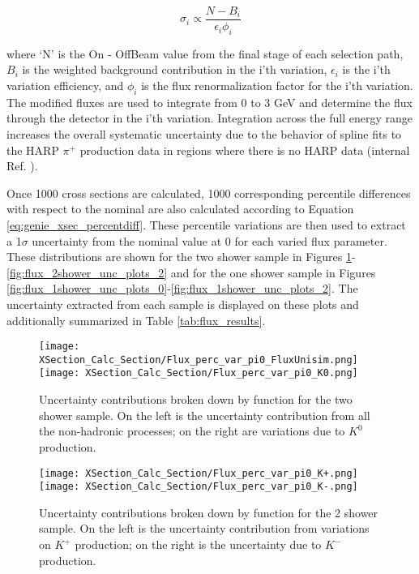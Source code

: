 \begin{equation} \label{eq:flux_xsec_var_0}
  \sigma_i \propto \frac{N - B_i}{\epsilon_i \phi_i} 
\end{equation}

\noindent where `N' is the On - OffBeam value from the final stage of each selection path, $B_i$ is the weighted background contribution in the i'th variation, $\epsilon_i$ is the i'th variation efficiency, and $\phi_i$ is the flux renormalization factor for the i'th variation.  The modified fluxes are used to integrate from 0 to 3 GeV and determine the flux through the detector in the i'th variation. Integration across the full energy range increases the overall systematic uncertainty due to the behavior of spline fits to the HARP $\pi^{+}$ production data in regions where there is no HARP data (internal Ref. \cite{bib:flux_uncertainty_tn}). 

Once 1000 cross sections are calculated, 1000 corresponding percentile differences with respect to the nominal are also calculated according to Equation \ref{eq:genie_xsec_percentdiff}. These percentile variations are then used to extract a 1$\sigma$ uncertainty from the nominal value at 0 for each varied flux parameter.  These distributions are shown for the two shower sample in Figures \ref{fig:flux_2shower_unc_plots_0}-\ref{fig:flux_2shower_unc_plots_2} and for the one shower sample in Figures \ref{fig:flux_1shower_unc_plots_0}-\ref{fig:flux_1shower_unc_plots_2}. The uncertainty extracted from each sample is displayed on these plots and additionally summarized in Table \ref{tab:flux_results}.  

\begin{figure}[H]
\centering
\texttt{[image: XSection\_Calc\_Section/Flux\_perc\_var\_pi0\_FluxUnisim.png]}
\texttt{[image: XSection\_Calc\_Section/Flux\_perc\_var\_pi0\_K0.png]}
\caption{ Uncertainty contributions broken down by function for the two shower sample. On the left is the uncertainty contribution from all the non-hadronic processes; on the right are variations due to $K^0$ production. }
\label{fig:flux_2shower_unc_plots_0}
\end{figure}

\begin{figure}[H]
\centering
\texttt{[image: XSection\_Calc\_Section/Flux\_perc\_var\_pi0\_K+.png]}
\texttt{[image: XSection\_Calc\_Section/Flux\_perc\_var\_pi0\_K-.png]}
\caption{ Uncertainty contributions broken down by function for the 2 shower sample. On the left is the uncertainty contribution from variations on $K^+$ production; on the right is the uncertainty due to $K^-$ production. }
\label{fig:flux_2shower_unc_plots_1}
\end{figure}

